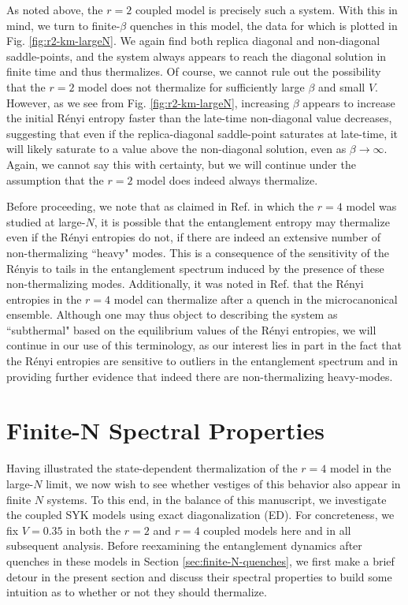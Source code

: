 \documentclass[reprint, floatfix,eqsecnum,superscriptaddress,preprint,nofootinbib,onecolumn,amsmath,amssymb,aps,prb]{revtex4-2}
\begin{document}
As noted above, the $r=2$ coupled model is precisely such a system. 
With this in mind, we turn to finite-$\beta$ quenches in this model, the data for which is plotted in Fig. \ref{fig:r2-km-largeN}. We again find both replica diagonal and non-diagonal saddle-points, and the system always appears to reach the diagonal solution in finite time and thus thermalizes.
Of course, we cannot rule out the possibility that the $r=2$ model does not thermalize for sufficiently large $\beta$ and small $V$.
However, as we see from Fig. \ref{fig:r2-km-largeN}, increasing $\beta$ appears to increase the initial R\'enyi entropy faster than the late-time non-diagonal value decreases, suggesting that even if the replica-diagonal saddle-point saturates at late-time, it will likely saturate to a value above the non-diagonal solution, even as $\beta \to \infty$. %
Again, we cannot say this with certainty, but we will continue under the assumption that the $r=2$ model does indeed always thermalize.

Before proceeding, we note that as claimed in Ref. \cite{Penington2019} in which the $r=4$ model was studied at large-$N$, it is possible that the entanglement entropy may thermalize even if the R\'enyi entropies do not, if there are indeed an extensive number of non-thermalizing ``heavy" modes. This is a consequence of the sensitivity of the R\'enyis to tails in the entanglement spectrum induced by the presence of these non-thermalizing modes. Additionally, it was noted in Ref. \cite{Penington2019} that the R\'enyi entropies in the $r=4$ model can thermalize after a quench in the microcanonical ensemble. Although one may thus object to describing the system as ``subthermal" based on the equilibrium values of the R\'enyi entropies, we will continue in our use of this terminology, as our interest lies in part in the fact that the R\'enyi entropies are sensitive to outliers in the entanglement spectrum and in providing further evidence that indeed there are non-thermalizing heavy-modes.

\section{Finite-N Spectral Properties \label{sec:spectral-properties} }

Having illustrated the state-dependent thermalization of the $r=4$ model in the large-$N$ limit, we now wish to see whether vestiges of this behavior also appear in finite $N$ systems. To this end, in the balance of this manuscript, we investigate the coupled SYK models using exact diagonalization (ED). For concreteness, we fix $V=0.35$ in both the $r=2$ and $r=4$ coupled models here and in all subsequent analysis.
Before reexamining the entanglement dynamics after quenches in these models in Section \ref{sec:finite-N-quenches}, we first make a brief detour in the present section and discuss their spectral properties to build some intuition as to whether or not they should thermalize.
\end{document}
